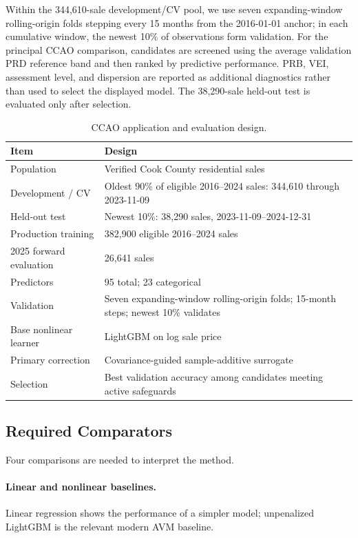 \documentclass[10pt]{article}
\theoremstyle{definition}
\newcommand{\1}{\mathbf{1}}
\newcommand{\advisorchange}[1]{{\color{blue}#1}}
\begin{document}
{{Within the 344,610-sale development/CV pool, we use seven expanding-window rolling-origin folds stepping every 15 months from the 2016-01-01 anchor; in each cumulative window, the newest 10\% of observations form validation. For the principal CCAO comparison, candidates are screened using the average validation PRD reference band and then ranked by predictive performance. PRB, VEI, assessment level, and dispersion are reported as additional diagnostics rather than used to select the displayed model. The 38,290-sale held-out test is evaluated only after selection.

\begin{table}[t]
\centering
\caption{\advisorchange{CCAO application and evaluation design.}}
\label{tab:ccao_design}
\begin{tabular}{ll}
\toprule
Item & Design \\
\midrule
Population & Verified Cook County residential sales \\
Development / CV & Oldest 90\% of eligible 2016--2024 sales: 344,610 through 2023-11-09 \\
Held-out test & Newest 10\%: 38,290 sales, 2023-11-09--2024-12-31 \\
Production training & 382,900 eligible 2016--2024 sales \\
2025 forward evaluation & 26,641 sales \\
Predictors & 95 total; 23 categorical \\
Validation & Seven expanding-window rolling-origin folds; 15-month steps; newest 10\% validates \\
Base nonlinear learner & LightGBM on log sale price \\
Primary correction & Covariance-guided sample-additive surrogate \\
Selection & Best validation accuracy among candidates meeting active safeguards \\
\bottomrule
\end{tabular}
\end{table}

\subsection{Required Comparators}
\label{subsec:comparators}

Four comparisons are needed to interpret the method.

\paragraph{Linear and nonlinear baselines.}
Linear regression shows the performance of a simpler model; unpenalized LightGBM is the relevant modern AVM baseline.

}}
\end{document}
